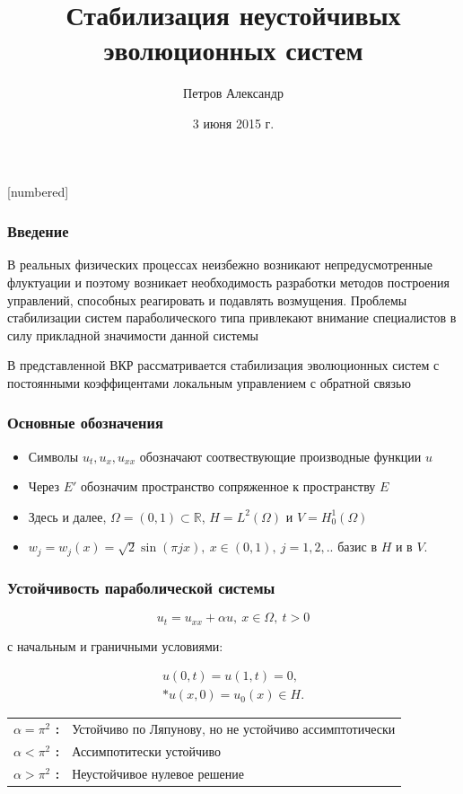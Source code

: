 \documentclass{beamer}
\title{Стабилизация неустойчивых эволюционных систем}
\author{Петров Александр}
\date{3 июня 2015 г.}
\begin{document}
[numbered]

\begin{frame}
\titlepage
\end{frame}


\begin{frame}
\frametitle{Введение}
\hspace{5mm} В реальных физических процессах неизбежно возникают 
непредусмотренные флуктуации и поэтому возникает необходимость разработки 
методов построения управлений, способных реагировать и подавлять возмущения. 
Проблемы стабилизации систем параболического типа привлекают внимание 
специалистов в силу прикладной значимости данной системы

\hspace{5mm} В представленной ВКР рассматривается стабилизация эволюционных систем с 
постоянными коэффицентами локальным управлением с обратной связью
\end{frame}

\begin{frame}
\frametitle{Основные обозначения}
\begin{itemize}
    \item Символы $u_t, u_x, u_{xx}$ обозначают соотвествующие производные функции $u$
    \item Через $E'$ обозначим пространство сопряженное к пространству $E$
    \item Здесь и далее, $\Omega = (0, 1) \subset \mathbb{R}$, $H = L^2(\Omega)$ и 
            $V = H^1_0(\Omega)$
    \item $w_j = w_j(x) = \sqrt{2}\sin{(\pi j x)}, \ x \in (0, 1), \
        j=1, 2,..$ базис в $H$ и в $V$.
\end{itemize}


\end{frame}

\begin{frame}
\frametitle{Устойчивость параболической системы}

\begin{block}{}
\begin{equation}\label{dif_form}
    u_t = u_{xx} + \alpha u, \ x \in \Omega, \ t > 0
\end{equation}
\end{block}
с начальным и граничными условиями:
\begin{block}{}
\begin{gather}\label{d_control}
    u(0, t) = u(1, t) = 0, \\*
    u(x, 0) = u_{0}(x) \in H. \nonumber
\end{gather}
\end{block}

\begin{tabular}{@{\textbullet~}l@{\ }p{3in}}
  \bfseries $\alpha = \pi^2$ : & Устойчиво по Ляпунову, но не устойчиво ассимптотически \\
  \bfseries $\alpha < \pi^2$ : & Ассимпотитески устойчиво \\
  \bfseries $\alpha > \pi^2$ : & Неустойчивое нулевое решение
\end{tabular}

\end{frame}
\end{document}
